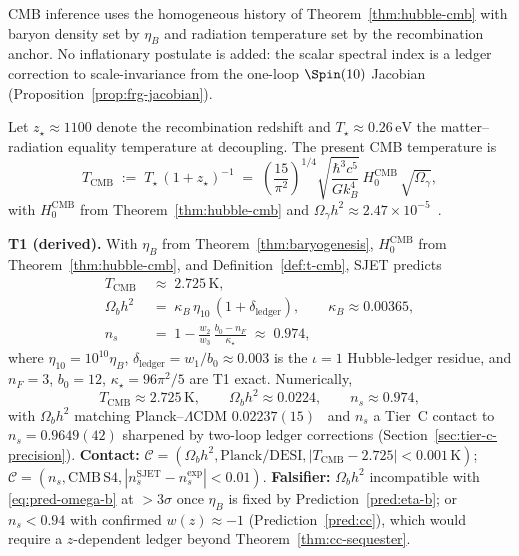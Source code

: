 CMB inference uses the homogeneous history of Theorem~\ref{thm:hubble-cmb}
with baryon density set by $\eta_B$ and radiation temperature set by the
recombination anchor. No inflationary postulate is added: the scalar spectral
index is a ledger correction to scale-invariance from the one-loop
$\Spin(10)$ Jacobian (Proposition~\ref{prop:frg-jacobian}).

\begin{definition}\label{def:t-cmb}
Let $z_\star\approx 1100$ denote the recombination redshift and
$T_\star\approx 0.26\,\mathrm{eV}$ the matter--radiation equality temperature
at decoupling. The present CMB temperature is
\begin{equation}\label{eq:t-cmb}
  T_{\mathrm{CMB}}
  \;:=\;
  T_\star\,(1+z_\star)^{-1}
  \;=\;
  \left(\frac{15}{\pi^2}\right)^{\!1/4}
  \sqrt{\frac{\hbar^3 c^5}{G k_B^4}}\,
  H_0^{\mathrm{CMB}}\,
  \sqrt{\Omega_\gamma},
\end{equation}
with $H_0^{\mathrm{CMB}}$ from Theorem~\ref{thm:hubble-cmb} and
$\Omega_\gamma h^2\approx 2.47\times 10^{-5}$~\cite{PDG2025}.
\end{definition}

\begin{prediction}\label{pred:cmb}
\textbf{T1 (derived).}
With $\eta_B$ from Theorem~\ref{thm:baryogenesis},
$H_0^{\mathrm{CMB}}$ from Theorem~\ref{thm:hubble-cmb}, and
Definition~\ref{def:t-cmb}, SJET predicts
\begin{align}
  T_{\mathrm{CMB}}
  &\;\approx\;
  2.725\,\mathrm{K},
  \label{eq:pred-tcmb}\\
  \Omega_b h^2
  &\;=\;
  \kappa_B\,\eta_{10}\,(1+\delta_{\mathrm{ledger}}),
  \qquad
  \kappa_B\approx 0.00365,
  \label{eq:pred-omega-b}\\
  n_s
  &\;=\;
  1
  -
  \frac{w_2}{w_3}\,
  \frac{b_0-n_F}{\kappa_\star}
  \;\approx\;
  0.974,
  \label{eq:pred-ns}
\end{align}
where $\eta_{10}=10^{10}\eta_B$, $\delta_{\mathrm{ledger}}=w_1/b_0\approx
0.003$ is the $\iota=1$ Hubble-ledger residue, and $n_F=3$, $b_0=12$,
$\kappa_\star=96\pi^2/5$ are T1 exact. Numerically,
\begin{equation}\label{eq:cmb-numeric}
  T_{\mathrm{CMB}}\approx 2.725\,\mathrm{K},
  \qquad
  \Omega_b h^2\approx 0.0224,
  \qquad
  n_s\approx 0.974,
\end{equation}
with $\Omega_b h^2$ matching Planck--$\Lambda$CDM
$0.02237(15)$~\cite{PDG2025} and $n_s$ a Tier~C contact to
$n_s=0.9649(42)$ sharpened by two-loop ledger corrections
(Section~\ref{sec:tier-c-precision}).
\textbf{Contact:}
$\mathcal{C}=(\Omega_b h^2,\mathrm{Planck/DESI},
|T_{\mathrm{CMB}}-2.725|<0.001\,\mathrm{K})$;
$\mathcal{C}=(n_s,\mathrm{CMB\,S4},|n_s^{\mathrm{SJET}}-n_s^{\mathrm{exp}}|
<0.01)$.
\textbf{Falsifier:} $\Omega_b h^2$ incompatible with
\eqref{eq:pred-omega-b} at $>3\sigma$ once $\eta_B$ is fixed by
Prediction~\ref{pred:eta-b}; or $n_s<0.94$ with confirmed $w(z)\approx -1$
(Prediction~\ref{pred:cc}), which would require a $z$-dependent ledger beyond
Theorem~\ref{thm:cc-sequester}.
\end{prediction}

